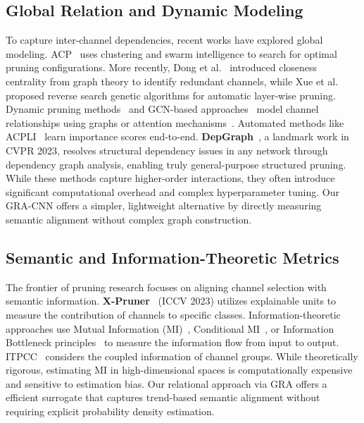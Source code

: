 \documentclass[sn-mathphys,Numbered]{sn-jnl}
\begin{document}
\subsection{Global Relation and Dynamic Modeling}
To capture inter-channel dependencies, recent works have explored global modeling. ACP~\cite{chang2022acp} uses clustering and swarm intelligence to search for optimal pruning configurations. More recently, Dong et al.~\cite{dong2024closeness} introduced closeness centrality from graph theory to identify redundant channels, while Xue et al.~\cite{xue2024rsga} proposed reverse search genetic algorithms for automatic layer-wise pruning. Dynamic pruning methods~\cite{hu2023dynamic_pruning,chen2021dynamical} and GCN-based approaches~\cite{jiang2022channel} model channel relationships using graphs or attention mechanisms~\cite{cheng2023differentiable}. Automated methods like ACPLI~\cite{treszczotko2021acpli} learn importance scores end-to-end. \textbf{DepGraph}~\cite{fang2023depgraph}, a landmark work in CVPR 2023, resolves structural dependency issues in any network through dependency graph analysis, enabling truly general-purpose structured pruning. While these methods capture higher-order interactions, they often introduce significant computational overhead and complex hyperparameter tuning. Our GRA-CNN offers a simpler, lightweight alternative by directly measuring semantic alignment without complex graph construction.

\subsection{Semantic and Information-Theoretic Metrics}
The frontier of pruning research focuses on aligning channel selection with semantic information. \textbf{X-Pruner}~\cite{yu2023xpruner} (ICCV 2023) utilizes explainable units to measure the contribution of channels to specific classes. Information-theoretic approaches use Mutual Information (MI)~\cite{lu2024enhancing}, Conditional MI~\cite{vuvan2024pruning}, or Information Bottleneck principles~\cite{mip2024mutual,dutta2024structured} to measure the information flow from input to output. ITPCC~\cite{rostami2025information} considers the coupled information of channel groups. While theoretically rigorous, estimating MI in high-dimensional spaces is computationally expensive and sensitive to estimation bias. Our relational approach via GRA offers a efficient surrogate that captures trend-based semantic alignment without requiring explicit probability density estimation.
\end{document}
